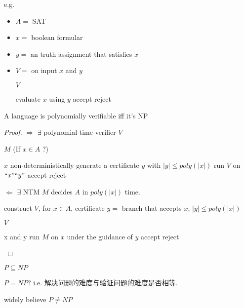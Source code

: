 e.g. 
\begin{itemize}
    \item $A=$ SAT
    \item $x=$ boolean formular
    \item $y=$ an truth assignment that satisfies $x$
    \item $V=$ on input $x$ and $y$
    \begin{algorithm}[H]
        \caption{$V$}
        \begin{algorithmic}
            \State evaluate $x$ using $y$
                \State accept
            \Else
                \State reject
            \EndIf
        \end{algorithmic}
    \end{algorithm}
\end{itemize}

\begin{theorem}
    A language is polynomially verifiable iff it's NP
\end{theorem}
\begin{proof}
    $\Rightarrow$ $\exists$ polynomial-time verifier $V$
    \begin{algorithm}[H]
        \caption{$M$ (If $x\in A$ ?)}
        \begin{algorithmic}
            \Require $x$
            \State non-deterministically generate a certificate $y$ with $|y|\le poly(|x|)$
            \State run $V$ on ${``x"}{``y"}$
                \State accept
            \Else
                \State reject
            \EndIf
        \end{algorithmic}
    \end{algorithm}
    
    $\Leftarrow$ $\exists$ NTM $M$ decides $A$ in $poly(|x|)$ time. 
    
    construct $V$, for $x\in A$, certificate $y=$ branch that accepts $x$, $|y|\le poly(|x|)$ 
    \begin{algorithm}[H]
        \caption{$V$}
        \begin{algorithmic}
            \Require x and y
            \State run $M$ on $x$ under the guidance of $y$
                \State accept
            \Else
                \State reject
            \EndIf
        \end{algorithmic}
    \end{algorithm}
\end{proof}

$P\subseteq NP$

$P= NP$? i.e. 解决问题的难度与验证问题的难度是否相等. 

widely believe $P\ne NP$
